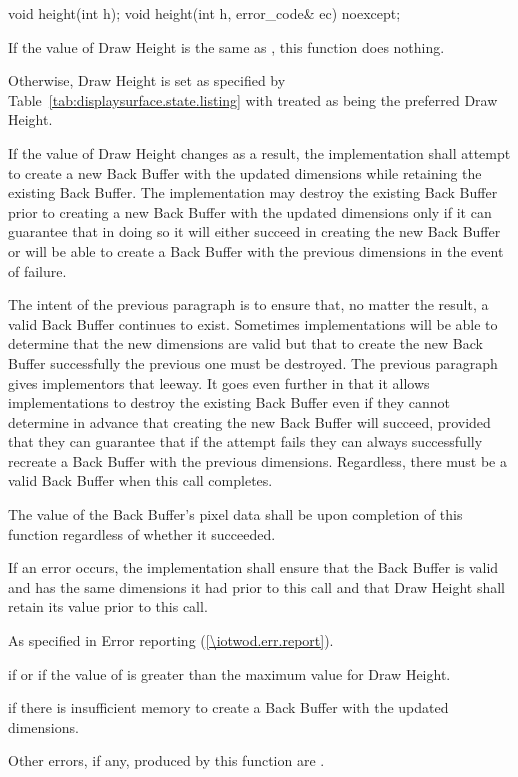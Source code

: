\begin{itemdecl}
void height(int h);
void height(int h, error_code& ec) noexcept;
\end{itemdecl}
\begin{itemdescr}
\pnum
\effects
If the value of Draw Height is the same as , this function does nothing.

\pnum
Otherwise, Draw Height is set as specified by Table~\ref{tab:displaysurface.state.listing} with  treated as being the preferred Draw Height.

\pnum
If the value of Draw Height changes as a result, the implementation shall attempt to create a new Back Buffer with the updated dimensions while retaining the existing Back Buffer. The implementation may destroy the existing Back Buffer prior to creating a new Back Buffer with the updated dimensions only if it can guarantee that in doing so it will either succeed in creating the new Back Buffer or will be able to create a Back Buffer with the previous dimensions in the event of failure.

\pnum
\enternote
The intent of the previous paragraph is to ensure that, no matter the result, a valid Back Buffer continues to exist. Sometimes implementations will be able to determine that the new dimensions are valid but that to create the new Back Buffer successfully the previous one must be destroyed. The previous paragraph gives implementors that leeway. It goes even further in that it allows implementations to destroy the existing Back Buffer even if they cannot determine in advance that creating the new Back Buffer will succeed, provided that they can guarantee that if the attempt fails they can always successfully recreate a Back Buffer with the previous dimensions. Regardless, there must be a valid Back Buffer when this call completes.
\exitnote

\pnum
The value of the Back Buffer's pixel data shall be \unspecnorm upon completion of this function regardless of whether it succeeded.

\pnum
If an error occurs, the implementation shall ensure that the Back Buffer is valid and has the same dimensions it had prior to this call and that Draw Height shall retain its value prior to this call.

\pnum
\throws
As specified in Error reporting (\ref{\iotwod.err.report}).

\pnum
\errors
{} if  or if the value of  is greater than the maximum value for Draw Height.

 if there is insufficient memory to create a Back Buffer with the updated dimensions.

Other errors, if any, produced by this function are .
\end{itemdescr}

